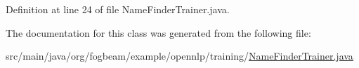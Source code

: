 Definition at line 24 of file Name\+Finder\+Trainer.\+java.



The documentation for this class was generated from the following file\+:\begin{DoxyCompactItemize}
\item 
src/main/java/org/fogbeam/example/opennlp/training/\hyperlink{_name_finder_trainer_8java}{Name\+Finder\+Trainer.\+java}\end{DoxyCompactItemize}
